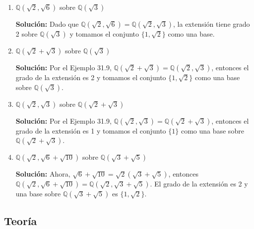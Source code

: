 \begin{enumerate}
    \item \( \mathbb{Q}(\sqrt{2}, \sqrt{6}) \) sobre \( \mathbb{Q}(\sqrt{3}) \)

    \textbf{Solución:} Dado que \( \mathbb{Q}(\sqrt{2}, \sqrt{6}) = \mathbb{Q}(\sqrt{2}, \sqrt{3}) \), la extensión tiene grado 2 sobre \( \mathbb{Q}(\sqrt{3}) \) y tomamos el conjunto \(\{1, \sqrt{2}\}\) como una base.

    \item \( \mathbb{Q}(\sqrt{2} + \sqrt{3}) \) sobre \( \mathbb{Q}(\sqrt{3}) \)

    \textbf{Solución:} Por el Ejemplo 31.9, \( \mathbb{Q}(\sqrt{2} + \sqrt{3}) = \mathbb{Q}(\sqrt{2}, \sqrt{3}) \), entonces el grado de la extensión es 2 y tomamos el conjunto \(\{1, \sqrt{2}\}\) como una base sobre \( \mathbb{Q}(\sqrt{3}) \).

    \item \( \mathbb{Q}(\sqrt{2}, \sqrt{3}) \) sobre \( \mathbb{Q}(\sqrt{2} + \sqrt{3}) \)

    \textbf{Solución:} Por el Ejemplo 31.9, \( \mathbb{Q}(\sqrt{2}, \sqrt{3}) = \mathbb{Q}(\sqrt{2} + \sqrt{3}) \), entonces el grado de la extensión es 1 y tomamos el conjunto \(\{1\}\) como una base sobre \( \mathbb{Q}(\sqrt{2} + \sqrt{3}) \).

    \item \( \mathbb{Q}(\sqrt{2}, \sqrt{6} + \sqrt{10}) \) sobre \( \mathbb{Q}(\sqrt{3} + \sqrt{5}) \)

    \textbf{Solución:} Ahora, \( \sqrt{6} + \sqrt{10} = \sqrt{2}(\sqrt{3} + \sqrt{5}) \), entonces \( \mathbb{Q}(\sqrt{2}, \sqrt{6} + \sqrt{10}) = \mathbb{Q}(\sqrt{2}, \sqrt{3} + \sqrt{5}) \). El grado de la extensión es 2 y una base sobre \( \mathbb{Q}(\sqrt{3} + \sqrt{5}) \) es \(\{1, \sqrt{2}\}\).

\end{enumerate}

\subsection*{Teoría}

